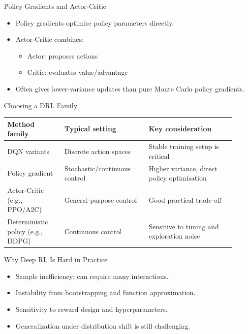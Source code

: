 \documentclass[aspectratio=169]{beamer}
\newcommand{\defaultdeckrefs}{AIMA4e Ch.22 pp.789--822; Poole3e Ch.13 pp.583--608}
\newcommand{\currentsliderefs}{\defaultdeckrefs}
\newcommand{\setslideref}[1]{\gdef\currentsliderefs{#1}}
\begin{document}
\setslideref{AIMA4e Ch.22 pp.789--822; Poole3e Ch.13 pp.583--608; doi:10.1038/nature14236}
\begin{frame}{Policy Gradients and Actor-Critic}
\begin{itemize}
  \item Policy gradients optimise policy parameters directly.
  \item Actor-Critic combines:
  \begin{itemize}
    \item Actor: proposes actions
    \item Critic: evaluates value/advantage
  \end{itemize}
  \item Often gives lower-variance updates than pure Monte Carlo policy gradients.
\end{itemize}
\end{frame}

\setslideref{AIMA4e Ch.22 pp.789--822; Poole3e Ch.13 pp.583--608; doi:10.1038/nature14236}
\begin{frame}{Choosing a DRL Family}
\begin{center}
\begin{tabular}{@{}p{0.23\linewidth}p{0.34\linewidth}p{0.35\linewidth}@{}}
\toprule
Method family & Typical setting & Key consideration \\
\midrule
DQN variants & Discrete action spaces & Stable training setup is critical \\
Policy gradient & Stochastic/continuous control & Higher variance, direct policy optimisation \\
Actor-Critic (e.g., PPO/A2C) & General-purpose control & Good practical trade-off \\
Deterministic policy (e.g., DDPG) & Continuous control & Sensitive to tuning and exploration noise \\
\bottomrule
\end{tabular}
\end{center}
\end{frame}

\setslideref{AIMA4e Ch.22 pp.789--822; Poole3e Ch.13 pp.583--608; doi:10.1038/nature14236}
\begin{frame}{Why Deep RL Is Hard in Practice}
\begin{itemize}
  \item Sample inefficiency: can require many interactions.
  \item Instability from bootstrapping and function approximation.
  \item Sensitivity to reward design and hyperparameters.
  \item Generalization under distribution shift is still challenging.
\end{itemize}
\end{frame}
\end{document}
